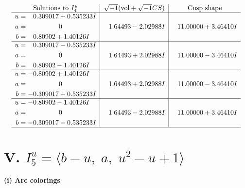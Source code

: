 \documentclass[1p]{elsarticle_modified}
\theoremstyle{definition}
\newcommand{\I}{\sqrt{-1}}
\begin{document}
$$\begin{array}{c|c|c}  
\text{Solutions to }I^u_{4}& \I (\text{vol} + \sqrt{-1}CS) & \text{Cusp shape}\\
 \hline 
\begin{aligned}
u &= \phantom{-}0.309017 + 0.535233 I \\
a &= \phantom{-0.000000 } 0 \\
b &= \phantom{-}0.80902 + 1.40126 I\end{aligned}
 & \phantom{-}1.64493 - 2.02988 I & \phantom{-}11.00000 + 3.46410 I \\ \hline\begin{aligned}
u &= \phantom{-}0.309017 - 0.535233 I \\
a &= \phantom{-0.000000 } 0 \\
b &= \phantom{-}0.80902 - 1.40126 I\end{aligned}
 & \phantom{-}1.64493 + 2.02988 I & \phantom{-}11.00000 - 3.46410 I \\ \hline\begin{aligned}
u &= -0.80902 + 1.40126 I \\
a &= \phantom{-0.000000 } 0 \\
b &= -0.309017 + 0.535233 I\end{aligned}
 & \phantom{-}1.64493 + 2.02988 I & \phantom{-}11.00000 - 3.46410 I \\ \hline\begin{aligned}
u &= -0.80902 - 1.40126 I \\
a &= \phantom{-0.000000 } 0 \\
b &= -0.309017 - 0.535233 I\end{aligned}
 & \phantom{-}1.64493 - 2.02988 I & \phantom{-}11.00000 + 3.46410 I\\
 \hline 
 \end{array}$$\newpage\newpage\renewcommand{\arraystretch}{1}
\centering \section*{V. $I^u_{5}= \langle b- u,\;a,\;u^2- u+1 \rangle$}
\flushleft \textbf{(i) Arc colorings}\\
\end{document}
